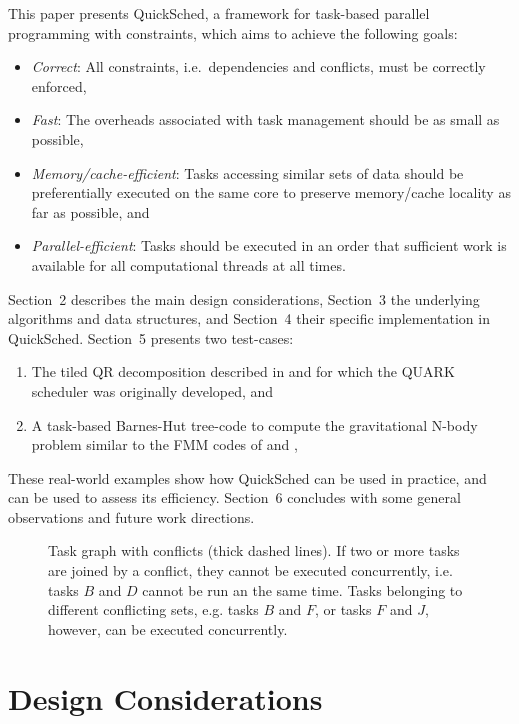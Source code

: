 \documentclass[preprint]{elsarticle}
\begin{document}
This paper presents QuickSched, a framework for task-based
parallel programming with constraints, which aims to achieve
the following goals:
\begin{itemize}
    \item {\em Correct}: All constraints, i.e.~dependencies and
        conflicts, must be correctly enforced,
    \item {\em Fast}: The overheads associated with task management
        should be as small as possible,
    \item {\em Memory/cache-efficient}: Tasks accessing similar
        sets of data should be preferentially executed on the
        same core to preserve memory/cache locality as far as possible, and
    \item {\em Parallel-efficient}: Tasks should be executed in an order
        that sufficient work is available for all computational
        threads at all times.
\end{itemize}
\noindent 
Section~2 describes the main design considerations, Section~3 the
underlying algorithms and data structures, and
Section~4 their specific implementation in QuickSched.
Section~5 presents two test-cases:
\begin{enumerate}
    \item The tiled QR
    decomposition described in \cite{ref:Buttari2009} and for
    which the QUARK scheduler was originally developed, and
    \item A task-based Barnes-Hut tree-code to compute the
    gravitational N-body problem similar to the FMM codes
    of \cite{ref:Ltaief2012} and \cite{ref:Agullo2013},
\end{enumerate}
These real-world examples show how QuickSched can be used in practice,
and can be used to assess its efficiency.
Section~6 concludes with some general observations and future work
directions.

\begin{figure}
    \centerline{}
    \caption{Task graph with conflicts (thick dashed lines).
        If two or more tasks are joined by a conflict, they cannot be
        executed concurrently, i.e. tasks $B$ and $D$ cannot be run an
        the same time.
        Tasks belonging to different conflicting sets, e.g. tasks $B$
        and $F$, or tasks $F$ and $J$, however, can be executed
        concurrently.}
    \label{fig:TaskConflicts}
\end{figure}


\section{Design Considerations}
\end{document}
